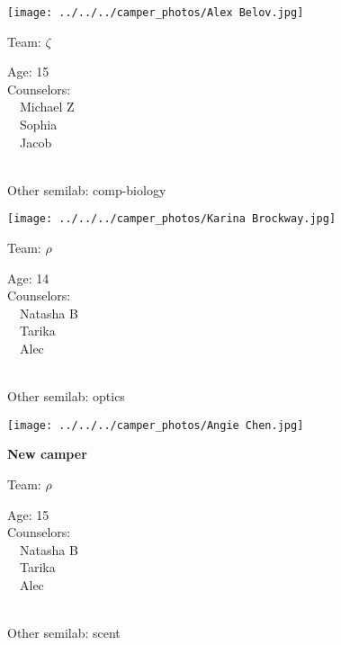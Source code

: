 \documentclass[10pt,letterpaper, landscape]{article}
\begin{document}
\verticalshiftfornextsticker
\renewcommand{\baselinestretch}{1} \begin{sticker}
\noindent\begin{minipage}{0.5\textwidth}\texttt{[image: ../../../camper\_photos/Alex Belov.jpg]}\end{minipage}\begin{minipage}{0.45\textwidth}
Team: {\Large $\zeta$}

Age:        15\\
Counselors: \\\ \ Michael Z\\\ \ Sophia\\\ \ Jacob\\
\end{minipage} \\ \vspace{0.07in}
Other semilab: comp-biology
\end{sticker}
\horizontalshiftfornextsticker
\renewcommand{\baselinestretch}{1} \begin{sticker}
\noindent\begin{minipage}{0.5\textwidth}\texttt{[image: ../../../camper\_photos/Karina Brockway.jpg]}\end{minipage}\begin{minipage}{0.45\textwidth}
Team: {\Large $\rho$}

Age:        14\\
Counselors: \\\ \ Natasha B\\\ \ Tarika\\\ \ Alec\\
\end{minipage} \\ \vspace{0.07in}
Other semilab: optics
\end{sticker}
\horizontalshiftfornextsticker
\renewcommand{\baselinestretch}{1} \begin{sticker}
\noindent\begin{minipage}{0.5\textwidth}\texttt{[image: ../../../camper\_photos/Angie Chen.jpg]}\end{minipage}\begin{minipage}{0.45\textwidth}
\textbf{New camper} 

Team: {\Large $\rho$}

Age:        15\\
Counselors: \\\ \ Natasha B\\\ \ Tarika\\\ \ Alec\\
\end{minipage} \\ \vspace{0.07in}
Other semilab: scent
\end{sticker}
\end{document}
